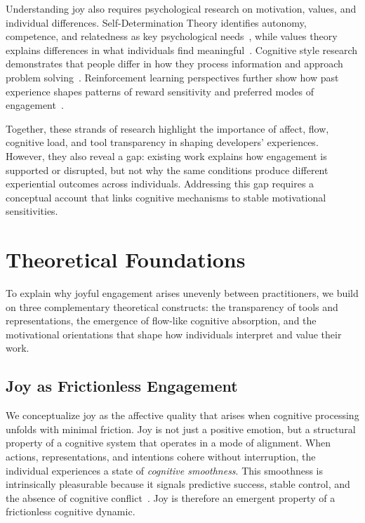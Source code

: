 \documentclass[12pt]{elsarticle}
\begin{document}
Understanding joy also requires psychological research on motivation, 
values, and individual differences. Self-Determination Theory identifies 
autonomy, competence, and relatedness as key psychological 
needs~\cite{ryan2000}, while values theory explains differences in what 
individuals find meaningful~\cite{schwartz1992}. Cognitive style research 
demonstrates that people differ in how they process information and 
approach problem solving~\cite{kozhevnikov2007}. Reinforcement learning 
perspectives further show how past experience shapes patterns of reward 
sensitivity and preferred modes of engagement~\cite{anderson2000}.

Together, these strands of research highlight the importance of affect, 
flow, cognitive load, and tool transparency in shaping developers' 
experiences. However, they also reveal a gap: existing work explains how 
engagement is supported or disrupted, but not why the same conditions 
produce different experiential outcomes across individuals. Addressing 
this gap requires a conceptual account that links cognitive mechanisms to 
stable motivational sensitivities.

\section{Theoretical Foundations}
\label{sec:foundations}

To explain why joyful engagement arises unevenly between practitioners, 
we build on three complementary theoretical constructs: the transparency 
of tools and representations, the emergence of flow-like cognitive 
absorption, and the motivational orientations that shape how individuals 
interpret and value their work.

\subsection{Joy as Frictionless Engagement}

We conceptualize joy as the affective quality that arises when cognitive 
processing unfolds with minimal friction. Joy is not just a positive 
emotion, but a structural property of a cognitive system that operates 
in a mode of alignment. When actions, representations, and intentions 
cohere without interruption, the individual experiences a state of 
\emph{cognitive smoothness}. This smoothness is intrinsically pleasurable 
because it signals predictive success, stable control, and the absence 
of cognitive conflict~\cite{berridge2012}. Joy is therefore an emergent 
property of a frictionless cognitive dynamic.
\end{document}
